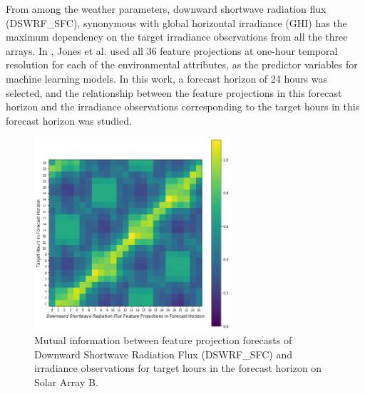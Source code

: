 \par From among the weather parameters, downward shortwave radiation flux (DSWRF\_SFC), synonymous with global horizontal irradiance (GHI) has the maximum dependency on the target irradiance observations from all the three arrays. In \cite{thesis_zach}, Jones et al. used all 36 feature projections at one-hour temporal resolution for each of the environmental attributes, as the predictor variables for machine learning models. In this work, a forecast horizon of 24 hours was selected, and the relationship between the feature projections in this forecast horizon and the irradiance observations corresponding to the target hours in this forecast horizon was studied. 

\begin{figure}[htb]
    \begin{center}
    	\includegraphics[width=0.65\textwidth]{chapter3/fig_mi_forecast_target.png}
    	\caption[Mutual information between Downward Shortwave Radiation Flux feature projection forecasts and irradiance observations for target hours in the forecast horizon from Solar Array B]{Mutual information between feature projection forecasts of Downward Shortwave Radiation Flux (DSWRF\_SFC) and irradiance observations for target hours in the forecast horizon on Solar Array B.}
    	\label{fig:fig_mi_forecast_target}
    \end{center}
\end{figure}

